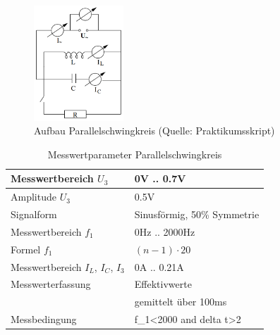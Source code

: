 \documentclass[12pt,a4paper]{article}
\begin{document}
\begin{figure}[H]
	\centering
	\includegraphics[width=0.3\textwidth]{Daten/Aufbau_Parallelschwingkreis.png}
	\caption{Aufbau Parallelschwingkreis (Quelle: Praktikumsskript)}
	\label{Aufbau_Parallelschaltung}
\end{figure}

\begin{table}[H]
	\centering
	\begin{tabular}{|l|l|}
		\hline
		Messwertbereich $U_3$&0V .. 0.7V\\
		\hline
		Amplitude $U_3$&0.5V\\
		\hline
		Signalform&Sinusförmig, 50\% Symmetrie\\
		\hline
		Messwertbereich $f_1$&0Hz .. 2000Hz\\
		\hline
		Formel $f_1$&$(n-1)\cdot20$\\
		\hline
		Messwertbereich $I_L$, $I_C$, $I_3$&0A .. 0.21A\\
		\hline
		Messwerterfassung&Effektivwerte\\
		&gemittelt über 100ms\\
		\hline
		Messbedingung&f\_1<2000 and delta t>2\\
		\hline
	\end{tabular}
	\caption{Messwertparameter Parallelschwingkreis}
	\label{table:Messwerterfassung_P}
\end{table}
\end{document}
